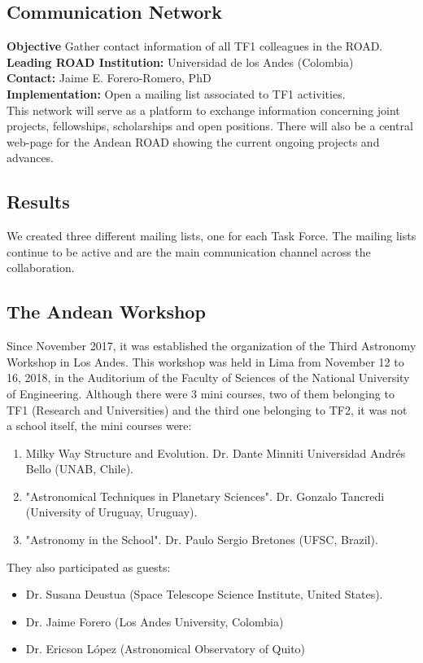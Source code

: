 \subsection{Communication Network}
\textbf{Objective} Gather contact information of all TF1 colleagues in the ROAD.
\\
\textbf{Leading ROAD Institution:} Universidad de los Andes (Colombia)
\\
\textbf{Contact:} Jaime E. Forero-Romero, PhD
\\
\textbf{Implementation:} Open a mailing list associated to TF1 activities.
\\
This network will serve as a platform to exchange information concerning joint projects, fellowships, scholarships and open positions. There will also be a central web-page for the Andean ROAD showing the current ongoing projects and advances.

\subsection{Results}
We created three different mailing lists, one for each Task Force. The mailing lists continue to be active 
and are the main comnunication channel across the collaboration.



\subsection{The Andean Workshop}
Since November 2017, it was established the organization of the Third Astronomy Workshop in Los Andes. This workshop was held in Lima from November 12 to 16, 2018, in the Auditorium of the Faculty of Sciences of the National University of Engineering. Although there were 3 mini courses, two of them belonging to TF1 (Research and Universities) and the third one belonging to TF2, it was not a school itself, the mini courses were:

\begin{enumerate}
    \item  Milky Way Structure and Evolution. Dr. Dante Minniti Universidad Andrés Bello (UNAB, Chile).
    \item "Astronomical Techniques in Planetary Sciences". Dr. Gonzalo Tancredi (University of Uruguay, Uruguay).
    \item "Astronomy in the School". Dr. Paulo Sergio Bretones (UFSC, Brazil).
\end{enumerate}
They also participated as guests:
\begin{itemize}
    \item Dr. Susana Deustua (Space Telescope Science Institute, United States).
    \item Dr. Jaime Forero (Los Andes University, Colombia)
    \item Dr. Ericson López (Astronomical Observatory of Quito)
\end{itemize}


